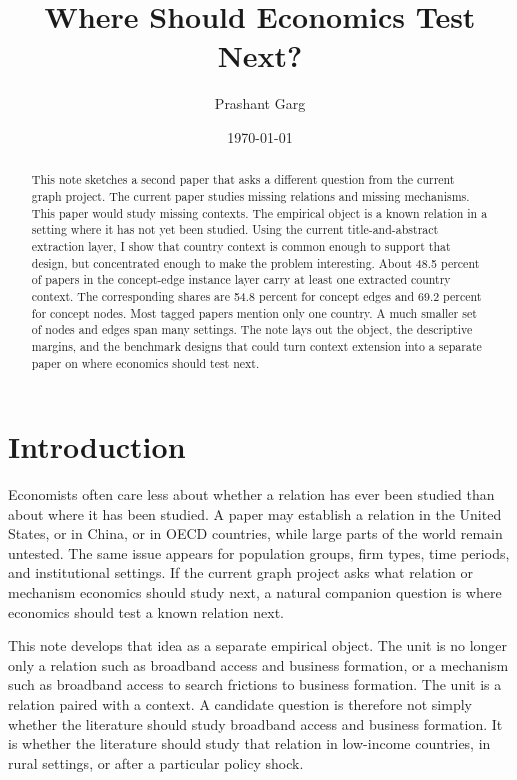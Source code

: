 \documentclass[11pt]{article}
\title{Where Should Economics Test Next?}
\author{Prashant Garg}
\date{\today}
\begin{document}
\maketitle

\begin{abstract}
This note sketches a second paper that asks a different question from the current graph project. The current paper studies missing relations and missing mechanisms. This paper would study missing contexts. The empirical object is a known relation in a setting where it has not yet been studied. Using the current title-and-abstract extraction layer, I show that country context is common enough to support that design, but concentrated enough to make the problem interesting. About 48.5 percent of papers in the concept-edge instance layer carry at least one extracted country context. The corresponding shares are 54.8 percent for concept edges and 69.2 percent for concept nodes. Most tagged papers mention only one country. A much smaller set of nodes and edges span many settings. The note lays out the object, the descriptive margins, and the benchmark designs that could turn context extension into a separate paper on where economics should test next.
\end{abstract}

\section{Introduction}
Economists often care less about whether a relation has ever been studied than about where it has been studied. A paper may establish a relation in the United States, or in China, or in OECD countries, while large parts of the world remain untested. The same issue appears for population groups, firm types, time periods, and institutional settings. If the current graph project asks what relation or mechanism economics should study next, a natural companion question is where economics should test a known relation next.

This note develops that idea as a separate empirical object. The unit is no longer only a relation such as broadband access and business formation, or a mechanism such as broadband access to search frictions to business formation. The unit is a relation paired with a context. A candidate question is therefore not simply whether the literature should study broadband access and business formation. It is whether the literature should study that relation in low-income countries, in rural settings, or after a particular policy shock.
\end{document}
